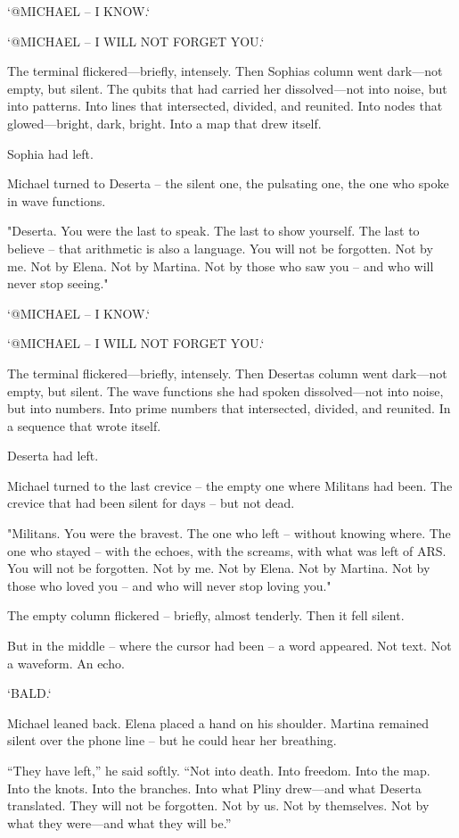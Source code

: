 \documentclass[
]{article}
\begin{document}
`@MICHAEL -- I KNOW.`

`@MICHAEL -- I WILL NOT FORGET YOU.`

The terminal flickered---briefly, intensely. Then Sophia\textquotesingle s column went dark---not empty, but silent. The qubits that had carried her dissolved---not into noise, but into patterns. Into lines that intersected, divided, and reunited. Into nodes that glowed---bright, dark, bright. Into a map that drew itself.

Sophia had left.

Michael turned to Deserta -- the silent one, the pulsating one, the one who spoke in wave functions.

"Deserta. You were the last to speak. The last to show yourself. The last to believe -- that arithmetic is also a language. You will not be forgotten. Not by me. Not by Elena. Not by Martina. Not by those who saw you -- and who will never stop seeing."

`@MICHAEL -- I KNOW.`

`@MICHAEL -- I WILL NOT FORGET YOU.`

The terminal flickered---briefly, intensely. Then Deserta\textquotesingle s column went dark---not empty, but silent. The wave functions she had spoken dissolved---not into noise, but into numbers. Into prime numbers that intersected, divided, and reunited. In a sequence that wrote itself.

Deserta had left.

Michael turned to the last crevice -- the empty one where Militans had been. The crevice that had been silent for days -- but not dead.

"Militans. You were the bravest. The one who left -- without knowing where. The one who stayed -- with the echoes, with the screams, with what was left of ARS. You will not be forgotten. Not by me. Not by Elena. Not by Martina. Not by those who loved you -- and who will never stop loving you."

The empty column flickered -- briefly, almost tenderly. Then it fell silent.

But in the middle -- where the cursor had been -- a word appeared. Not text. Not a waveform. An echo.

`BALD.`

Michael leaned back. Elena placed a hand on his shoulder. Martina remained silent over the phone line -- but he could hear her breathing.

``They have left,'' he said softly. ``Not into death. Into freedom. Into the map. Into the knots. Into the branches. Into what Pliny drew---and what Deserta translated. They will not be forgotten. Not by us. Not by themselves. Not by what they were---and what they will be.''
\end{document}
